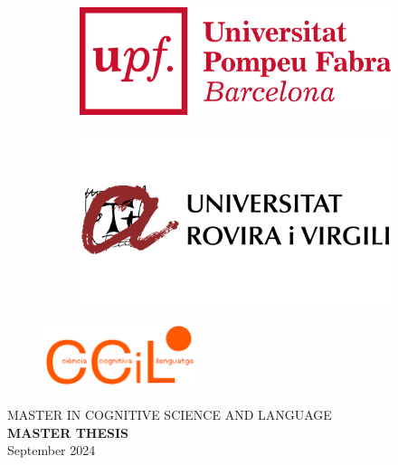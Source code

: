\begin{titlepage}
\begin{figure}[h]
\begin{subfigure}[h]{0.2\textwidth}
        \includegraphics[width=\textwidth]{images/upf_logo.png}
    \end{subfigure}
    \hfill
    \begin{subfigure}[h]{0.2\textwidth}
        \includegraphics[width=\textwidth]{images/urv_logo.png}
    \end{subfigure}
\end{figure}


\begin{figure}[h]
    \centering
    \includegraphics[width=0.4\textwidth]{images/logo ccil.png}
\end{figure}

\vspace{4mm}
\begin{center}
  {\LARGE{MASTER IN COGNITIVE SCIENCE AND LANGUAGE}}
  \vspace{7mm}
  \\ {\large\textbf{MASTER THESIS}}
  \vspace{4mm}
  \\ {\Large{September 2024}}
\end{center}


\end{titlepage}
